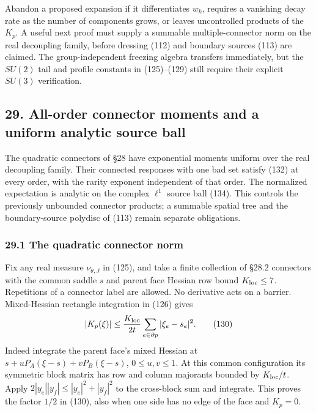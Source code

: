 \documentclass[11pt,a4paper]{article}
\begin{document}
Abandon a proposed expansion if it differentiates \(w_k\), requires a
vanishing decay rate as the number of components grows, or leaves
uncontrolled products of the \(K_p\). A useful next proof must supply a
summable multiple-connector norm on the real decoupling family, before
dressing (112) and boundary sources (113) are claimed. The
group-independent freezing algebra transfers immediately, but the
\(SU(2)\) tail and profile constants in (125)--(129) still require their
explicit \(SU(3)\) verification.

\hypertarget{all-order-connector-moments-and-a-uniform-analytic-source-ball}{%
\subsection{29. All-order connector moments and a uniform analytic
source
ball}\label{all-order-connector-moments-and-a-uniform-analytic-source-ball}}

The quadratic connectors of §28 have exponential moments uniform over
the real decoupling family. Their connected responses with one bad set
satisfy (132) at every order, with the rarity exponent independent of
that order. The normalized expectation is analytic on the complex
\(\ell^1\) source ball (134). This controls the previously unbounded
connector products; a summable spatial tree and the boundary-source
polydisc of (113) remain separate obligations.

\hypertarget{the-quadratic-connector-norm}{%
\subsubsection{29.1 The quadratic connector
norm}\label{the-quadratic-connector-norm}}

Fix any real measure \(\nu_{\theta,J}\) in (125), and take a finite
collection of §28.2 connectors with the common saddle \(s\) and parent
face Hessian row bound \(K_{\rm loc}\le7\). Repetitions of a connector
label are allowed. No derivative acts on a barrier. Mixed-Hessian
rectangle integration in (126) gives
\[|K_p(\xi)|\le\frac{K_{\rm loc}}{2t}
                   \sum_{e\in\partial p}|\xi_e-s_e|^2.
\tag{130}\] Indeed integrate the parent face's mixed Hessian at
\(s+uP_A(\xi-s)+vP_B(\xi-s)\), \(0\le u,v\le1\). At this common
configuration its symmetric block matrix has row and column majorants
bounded by \(K_{\rm loc}/t\). Apply \(2|y_e||y_f|\le|y_e|^2+|y_f|^2\) to
the cross-block sum and integrate. This proves the factor \(1/2\) in
(130), also when one side has no edge of the face and \(K_p=0\).
\end{document}
